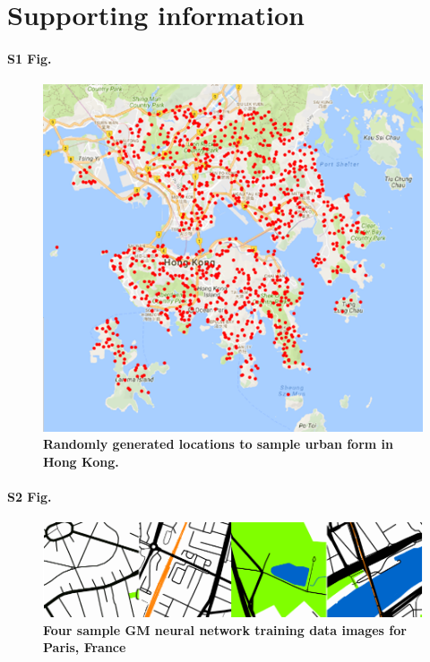 \documentclass[10pt,letterpaper]{article}
\begin{document}
\section*{Supporting information}

\paragraph*{S1 Fig.}
\begin{figure}[!htbp] 
\centering    
\includegraphics[scale=0.5]{Images/PlosOne/Fig1.png} 
\caption{\bf Randomly generated locations to sample urban form in Hong Kong.} 
\label{fig:hongkong}  
\end{figure}


\paragraph*{S2 Fig.}
\begin{figure}[!htbp]
    \centering    
\includegraphics[scale=1]{Images/PlosOne/Fig2.png}  
\caption{\bf Four sample GM neural network training data images for Paris, France \cite{GoogleStatic2017}}    
 \label{fig:maps}  
\end{figure} 
\end{document}
